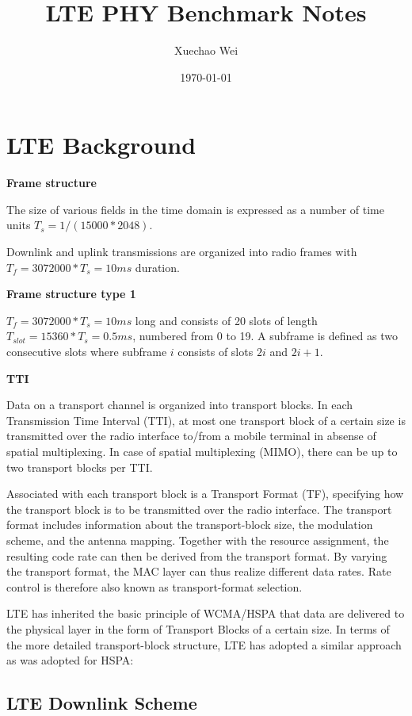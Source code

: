 \documentclass[titlepage]{article}
\numberwithin{figure}{section}
\numberwithin{equation}{section}
\begin{document}
\title{LTE PHY Benchmark Notes}
\author{Xuechao Wei}
\date{\today}
\maketitle



\section{LTE Background}

\textbf{Frame structure}\cite{erik}

The size of various fields in the time domain is expressed as a number of time units $T_{s}=1/(15000*2048)$.

Downlink and uplink transmissions are organized into radio frames with $T_{f}=3072000*T_{s}=10ms$ duration.

\textbf{Frame structure type 1}

$T_{f}=3072000*T_{s}=10ms$ long and consists of 20 slots of length $T_{slot}=15360*T_{s}=0.5ms$, numbered from 0 to 19. A subframe is defined as two consecutive slots where subframe $i$ consists of slots $2i$ and $2i+1$.

\textbf{TTI}

Data on a transport channel is organized into transport blocks. In each Transmission Time Interval (TTI), at most one transport block of a certain size is transmitted over the radio interface to/from a mobile terminal in absense of spatial multiplexing. In case of spatial multiplexing (MIMO), there can be up to two transport blocks per TTI.

Associated with each transport block is a Transport Format (TF), specifying how the transport block is to be transmitted over the radio interface. The transport format includes information about the transport-block size, the modulation scheme, and the antenna mapping. Together with the resource assignment, the resulting code rate can then be derived from the transport format. By varying the transport format, the MAC layer can thus realize different data rates. Rate control is therefore also known as transport-format selection.

LTE has inherited the basic principle of WCMA/HSPA that data are delivered to the physical layer in the form of Transport Blocks of a certain size. In terms of the more detailed transport-block structure, LTE has adopted a similar approach as was adopted for HSPA:

\subsection{LTE Downlink Scheme}
\end{document}
